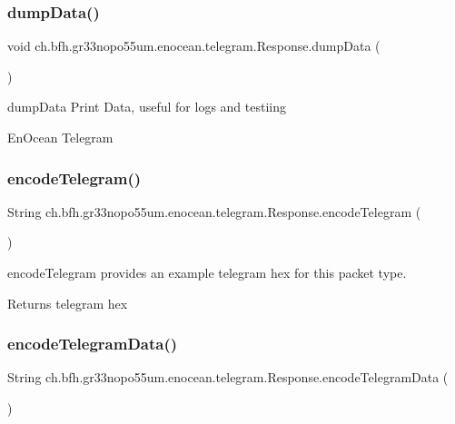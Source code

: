 \subsubsection{\texorpdfstring{dump\+Data()}{dumpData()}}
{\footnotesize\ttfamily void ch.\+bfh.\+gr33nopo55um.\+enocean.\+telegram.\+Response.\+dump\+Data (\begin{DoxyParamCaption}{ }\end{DoxyParamCaption})}

dump\+Data Print Data, useful for logs and testiing 

En\+Ocean Telegram \hypertarget{classch_1_1bfh_1_1gr33nopo55um_1_1enocean_1_1telegram_1_1_response_a988abdfe7c98ef8d8dedd603b665a4d8}{}\label{classch_1_1bfh_1_1gr33nopo55um_1_1enocean_1_1telegram_1_1_response_a988abdfe7c98ef8d8dedd603b665a4d8} 
\subsubsection{\texorpdfstring{encode\+Telegram()}{encodeTelegram()}}
{\footnotesize\ttfamily String ch.\+bfh.\+gr33nopo55um.\+enocean.\+telegram.\+Response.\+encode\+Telegram (\begin{DoxyParamCaption}{ }\end{DoxyParamCaption})}

encode\+Telegram provides an example telegram hex for this packet type.

\begin{DoxyReturn}{Returns}
telegram hex 
\end{DoxyReturn}
\hypertarget{classch_1_1bfh_1_1gr33nopo55um_1_1enocean_1_1telegram_1_1_response_ac4f9682e55795ebf981ec273ea09dfd0}{}\label{classch_1_1bfh_1_1gr33nopo55um_1_1enocean_1_1telegram_1_1_response_ac4f9682e55795ebf981ec273ea09dfd0} 
\subsubsection{\texorpdfstring{encode\+Telegram\+Data()}{encodeTelegramData()}}
{\footnotesize\ttfamily String ch.\+bfh.\+gr33nopo55um.\+enocean.\+telegram.\+Response.\+encode\+Telegram\+Data (\begin{DoxyParamCaption}{ }\end{DoxyParamCaption})}

